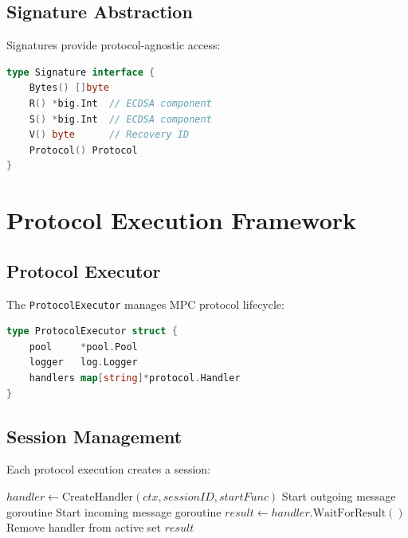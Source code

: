 \documentclass[11pt,twocolumn]{article}
\begin{document}
\subsection{Signature Abstraction}

Signatures provide protocol-agnostic access:

\begin{lstlisting}[language=Go,basicstyle=\ttfamily\small]
type Signature interface {
    Bytes() []byte
    R() *big.Int  // ECDSA component
    S() *big.Int  // ECDSA component
    V() byte      // Recovery ID
    Protocol() Protocol
}
\end{lstlisting}

\section{Protocol Execution Framework}

\subsection{Protocol Executor}

The \texttt{ProtocolExecutor} manages MPC protocol lifecycle:

\begin{lstlisting}[language=Go,basicstyle=\ttfamily\small]
type ProtocolExecutor struct {
    pool     *pool.Pool
    logger   log.Logger
    handlers map[string]*protocol.Handler
}
\end{lstlisting}

\subsection{Session Management}

Each protocol execution creates a session:

\begin{algorithm}
\caption{Protocol Session Lifecycle}
\label{alg:session-lifecycle}
\begin{algorithmic}[1]
    \State $handler \gets \text{CreateHandler}(ctx, sessionID, startFunc)$
    \State Start outgoing message goroutine
    \State Start incoming message goroutine
    \State $result \gets handler.\text{WaitForResult}()$
    \State Remove handler from active set
    \State \Return $result$
\EndProcedure
\end{algorithmic}
\end{algorithm}
\end{document}
